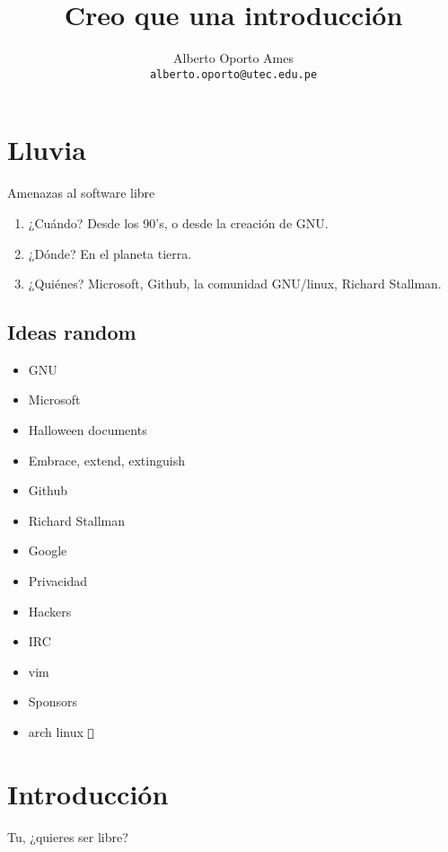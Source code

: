 \documentclass[12pt]{article}
\title{\textbf{Creo que una introducción}}
\author{
		Alberto Oporto Ames\\
		\texttt{alberto.oporto@utec.edu.pe}
		}
\newcommand{\btw}{{\color{arch}\texttt{ }} }
\begin{document}
\maketitle
\thispagestyle{fancy}

\section{Lluvia}
\label{sec:Lluvia}

Amenazas al software libre

\begin{enumerate}
	\item ¿Cuándo?
		\subitem Desde los 90's, o desde la creación de GNU.
	\item ¿Dónde?
		\subitem En el planeta tierra.
	\item ¿Quiénes?
		\subitem Microsoft, Github, la comunidad GNU/linux, Richard Stallman.
\end{enumerate}
\subsection{Ideas random}%
\label{sub:Ideas random}
\begin{itemize}
	\item GNU
	\item Microsoft
	\item Halloween documents
	\item Embrace, extend, extinguish
	\item Github
	\item Richard Stallman
	\item Google
	\item Privacidad
	\item Hackers
	\item IRC
	\item vim
	\item Sponsors
	\item arch linux \btw
\end{itemize}
\section{Introducción}%
\label{sec:Introducción}

Tu, ¿quieres ser libre?
\end{document}
